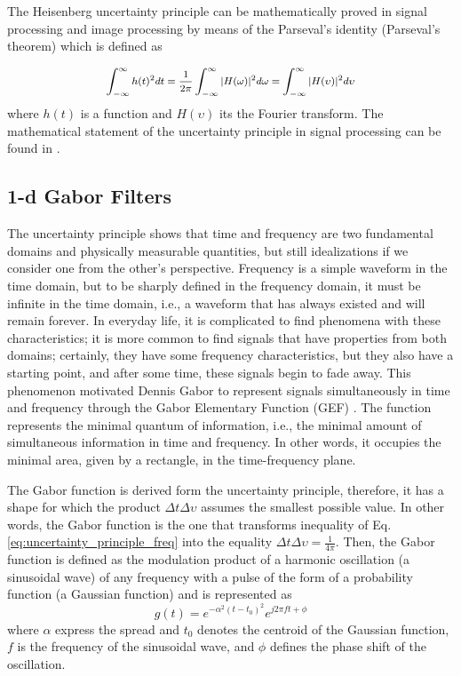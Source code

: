 \documentclass[journal]{IEEEtran}
\begin{document}
The Heisenberg uncertainty principle can be mathematically proved in signal processing and image processing by means of the Parseval's identity (Parseval's theorem) which is defined as

\begin{equation}\label{eq:parseval_theorem}
	\medmath{\int_{-\infty}^{\infty} h(t)^2 dt =  \frac{1}{2 \pi} \int_{-\infty}^{\infty} |H(\omega)|^2 d\omega =  \int_{-\infty}^{\infty} |H(\upsilon)|^2 d\upsilon}
\end{equation}
where $h(t)$ is a function and $H(\upsilon)$ its the Fourier transform. The mathematical statement of the uncertainty principle in signal processing can be found in \cite{Petrou.Sevilla:Book:2006}.

\subsection{1-d Gabor Filters}
The uncertainty principle shows that time and frequency are two fundamental domains and physically measurable quantities, but still idealizations if we consider one from the other's perspective. Frequency is a simple waveform in the time domain, but to be sharply defined in the frequency domain, it must be infinite in the time domain, i.e., a waveform that has always existed and will remain forever. In everyday life, it is complicated to find phenomena with these characteristics; it is more common to find signals that have properties from both domains; certainly, they have some frequency characteristics, but they also have a starting point, and after some time, these signals begin to fade away. This phenomenon motivated Dennis Gabor to represent signals simultaneously in time and frequency through the Gabor Elementary Function (GEF) \cite{Gabor:JIEE:1946}. The function represents the minimal quantum of information, i.e., the minimal amount of simultaneous information in time and frequency. In other words, it occupies the minimal area, given by a rectangle, in the time-frequency plane.  

The Gabor function is derived form the uncertainty principle, therefore, it has a shape for which the product $\Delta t \Delta \upsilon$ assumes the smallest possible value. In other words, the Gabor function is the one that transforms inequality of Eq. \eqref{eq:uncertainty_principle_freq} into the equality $\Delta t \Delta \upsilon = \frac{1}{4 \pi}$. Then, the Gabor function is defined as the modulation product of a harmonic oscillation (a sinusoidal wave) of any frequency with a pulse of the form of a probability function (a Gaussian function) \cite{Gabor:JIEE:1946} and is represented as
\begin{equation}\label{eq:gabor_function_1d_time}
    g(t) =  e ^{-\alpha^2(t-t_0)^2} e ^{j 2 \pi f t + \phi}
\end{equation}
where $\alpha$ express the spread and $t_0$ denotes the centroid of the Gaussian function, $f$ is the frequency of the sinusoidal wave, and $\phi$ defines the phase shift of the oscillation.
\end{document}
